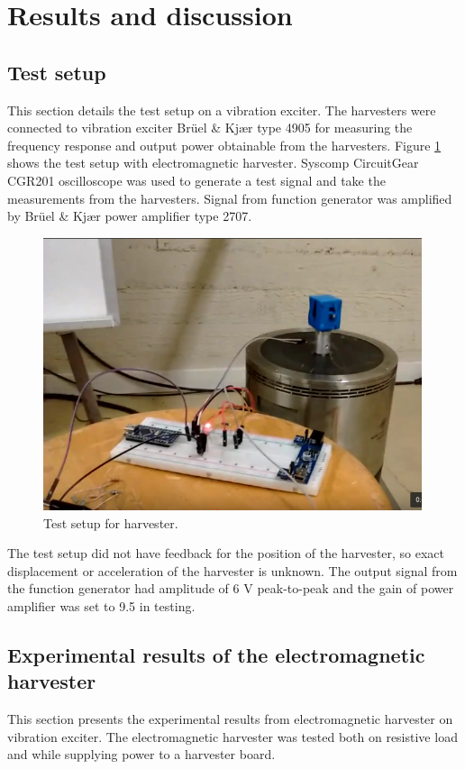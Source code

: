\section{Results and discussion}
\subsection{Test setup} \label{sect:lg_test_setup}
This section details the test setup on a vibration exciter. The harvesters were connected to vibration exciter Brüel \& Kjær type 4905 for measuring the frequency response and output power obtainable from the harvesters. Figure \ref{fig:emh_shaker} shows the test setup with electromagnetic harvester. Syscomp CircuitGear CGR201 oscilloscope was used to generate a test signal and take the measurements from the harvesters. Signal from function generator was amplified by Brüel \& Kjær power amplifier type 2707.

\begin{figure}[htb]
\begin{center}
\includegraphics[height=8cm]{images/own_pic/shaker_setup/emh_shaker.png}
\end{center}
\caption{\label{fig:emh_shaker} Test setup for harvester.}
\end{figure}

The test setup did not have feedback for the position of the harvester, so exact displacement or acceleration of the harvester is unknown. The output signal from the function generator had amplitude of 6 V peak-to-peak and the gain of power amplifier was set to 9.5 in testing.

\subsection{Experimental results of the electromagnetic harvester}
This section presents the experimental results from electromagnetic harvester on vibration exciter. The electromagnetic harvester was tested both on resistive load and while supplying power to a harvester board. 

